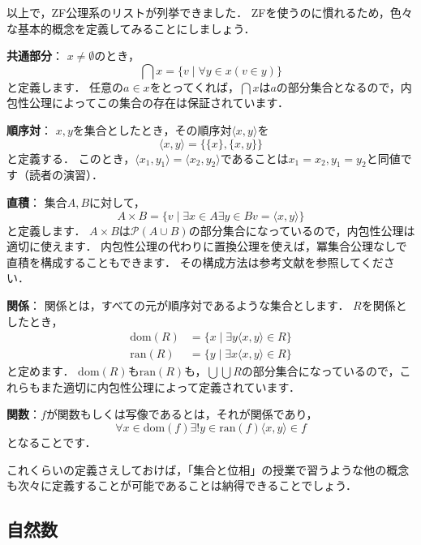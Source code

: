 \documentclass[./main]{subfiles}
\newcommand{\tbf}{\textbf}
\newcommand{\mcl}{\mathcal}
\begin{document}
以上で，ZF公理系のリストが列挙できました．
ZFを使うのに慣れるため，色々な基本的概念を定義してみることにしましょう．

\tbf{共通部分}：
$x\neq\emptyset$のとき，
\[
\bigcap x=\{v\mid\forall y\in x(v\in y)\}
\]
と定義します．
任意の$a\in x$をとってくれば，$\bigcap x$は$a$の部分集合となるので，内包性公理によってこの集合の存在は保証されています．

\tbf{順序対}：
$x, y$を集合としたとき，その順序対$\langle x, y \rangle$を
\[
\langle x, y\rangle=\{\{x\}, \{x, y\}\}
\]
と定義する．
このとき，$\langle x_1, y_1\rangle=\langle x_2, y_2\rangle$であることは$x_1=x_2, y_1=y_2$と同値です（読者の演習）．

\tbf{直積}：
集合$A, B$に対して，
\[
A\times B=\{v \mid \exists x\in A\exists y\in B v=\langle x, y\rangle\}
\]
と定義します．
$A\times B$は$\mcl{P}(A\cup B)$の部分集合になっているので，内包性公理は適切に使えます．
内包性公理の代わりに置換公理を使えば，冪集合公理なしで直積を構成することもできます．
その構成方法は参考文献を参照してください．

\tbf{関係}：
関係とは，すべての元が順序対であるような集合とします．
$R$を関係としたとき，
\begin{align*}
\text{dom}(R) &=\{x\mid\exists y \langle x, y\rangle\in R\}\\
\text{ran}(R) &=\{y\mid\exists x \langle x,y\rangle\in R\}
\end{align*}
と定めます．
$\text{dom}(R)$も$\text{ran}(R)$も，$\bigcup\bigcup R$の部分集合になっているので，これらもまた適切に内包性公理によって定義されています．

\tbf{関数}：$f$が関数もしくは写像であるとは，それが関係であり，
\[
\forall x\in\text{dom}(f)\exists ! y\in\text{ran}(f)\langle x,y\rangle\in f
\]
となることです．

これくらいの定義さえしておけば，「集合と位相」の授業で習うような他の概念も次々に定義することが可能であることは納得できることでしょう．

\subsection{自然数}
\end{document}
